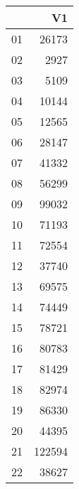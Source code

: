\documentclass[12pt]{article}
\begin{document}
\begin{table}[ht]
\centering
\begin{tabular}{rr}
  \hline
 & V1 \\ 
  \hline
01 & 26173 \\ 
  02 & 2927 \\ 
  03 & 5109 \\ 
  04 & 10144 \\ 
  05 & 12565 \\ 
  06 & 28147 \\ 
  07 & 41332 \\ 
  08 & 56299 \\ 
  09 & 99032 \\ 
  10 & 71193 \\ 
  11 & 72554 \\ 
  12 & 37740 \\ 
  13 & 69575 \\ 
  14 & 74449 \\ 
  15 & 78721 \\ 
  16 & 80783 \\ 
  17 & 81429 \\ 
  18 & 82974 \\ 
  19 & 86330 \\ 
  20 & 44395 \\ 
  21 & 122594 \\ 
  22 & 38627 \\ 
   \hline
\end{tabular}
\end{table}
\end{document}
